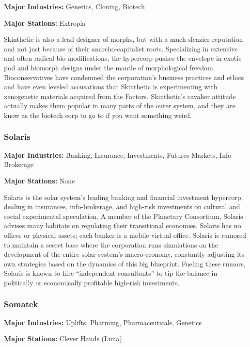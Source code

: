\textbf{Major Industries:} Genetics, Cloning, Biotech 

\textbf{Major Stations:} Extropia 

 Skinthetic is also a lead designer of morphs, but with a much sleazier reputation and not just because of their anarcho-capitalist roots. Specializing in extensive and often radical bio-modifications, the hypercorp pushes the envelope in exotic pod and biomorph designs under the mantle of morphological freedom. Bioconservatives have condemned the corporation's business practices and ethics and have even leveled accusations that Skinthetic is experimenting with xenogenetic materials acquired from the Factors. Skinthetic's cavalier attitude actually makes them popular in many parts of the outer system, and they are know as the biotech corp to go to if you want something weird. 

\subsubsection{Solaris}
\label{sec:solaris} 

\textbf{Major Industries:} Banking, Insurance, Investments, Futures Markets, Info Brokerage 

\textbf{Major Stations:} None 

 Solaris is the solar system's leading banking and financial investment hypercorp, dealing in insurances, info-brokerage, and high-risk investments on cultural and social experimental speculation. A member of the Planetary Consortium, Solaris advises many habitats on regulating their transitional economies. Solaris has no offices or physical assets; each banker is a mobile virtual office. Solaris is rumored to maintain a secret base where the corporation runs simulations on the development of the entire solar system's macro-economy, constantly adjusting its own strategies based on the dynamics of this big blueprint. Fueling these rumors, Solaris is known to hire “independent consultants” to tip the balance in politically or economically profitable high-risk investments. 

\subsubsection{Somatek}
\label{sec:somatek} 

\textbf{Major Industries:} Uplifts, Pharming, Pharmaceuticals, Genetics 

\textbf{Major Stations:} Clever Hands (Luna) 

